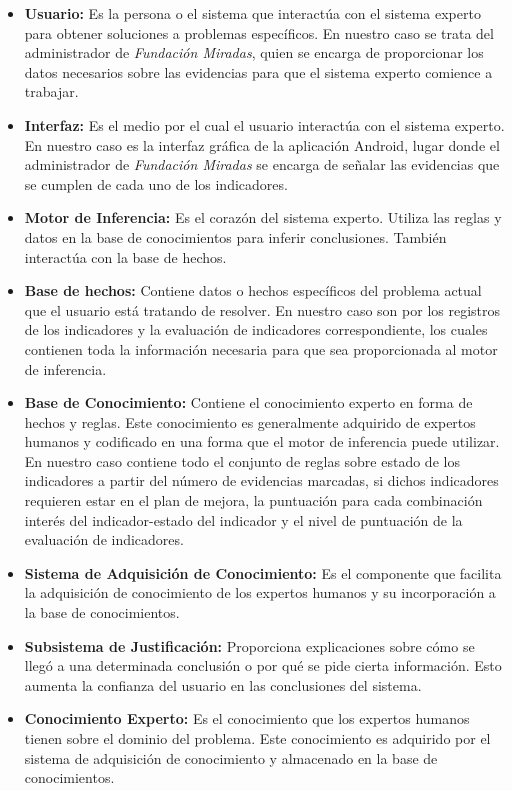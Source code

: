 \begin{itemize}
    \item \textbf{Usuario:} Es la persona o el sistema que interactúa con el sistema
    experto para obtener soluciones a problemas específicos. En nuestro caso se
    trata del administrador de \textit{Fundación Miradas}, quien se encarga de
    proporcionar los datos necesarios sobre las evidencias para que el sistema
    experto comience a trabajar.
    \item \textbf{Interfaz:} Es el medio por el cual el usuario interactúa con
    el sistema experto. En nuestro caso es la interfaz gráfica de la aplicación
    Android, lugar donde el administrador de \textit{Fundación Miradas} se
    encarga de señalar las evidencias que se cumplen de cada uno de los
    indicadores.
    \item \textbf{Motor de Inferencia:} Es el corazón del sistema experto.
    Utiliza las reglas y datos en la base de conocimientos para inferir
    conclusiones. También interactúa con la base de hechos.
    \item \textbf{Base de hechos:} Contiene datos o hechos específicos del
    problema actual que el usuario está tratando de resolver. En nuestro caso
    son por los registros de los indicadores y la evaluación de indicadores
    correspondiente, los cuales contienen toda la información necesaria para que
    sea proporcionada al motor de inferencia.
    \item \textbf{Base de Conocimiento:} Contiene el conocimiento experto en
    forma de hechos y reglas. Este conocimiento es generalmente adquirido de
    expertos humanos y codificado en una forma que el motor de inferencia puede
    utilizar. En nuestro caso contiene todo el conjunto de reglas sobre estado
    de los indicadores a partir del número de evidencias marcadas, si dichos
    indicadores requieren estar en el plan de mejora, la puntuación para cada
    combinación interés del indicador-estado del indicador y el nivel de
    puntuación de la evaluación de indicadores.
    \item \textbf{Sistema de Adquisición de Conocimiento:} Es el componente que
    facilita la adquisición de conocimiento de los expertos humanos y su
    incorporación a la base de conocimientos.
    \item \textbf{Subsistema de Justificación:} Proporciona explicaciones sobre
    cómo se llegó a una determinada conclusión o por qué se pide cierta
    información. Esto aumenta la confianza del usuario en las conclusiones del
    sistema.
    \item \textbf{Conocimiento Experto:} Es el conocimiento que los expertos
    humanos tienen sobre el dominio del problema. Este conocimiento es adquirido
    por el sistema de adquisición de conocimiento y almacenado en la base de
    conocimientos.
\end{itemize}


